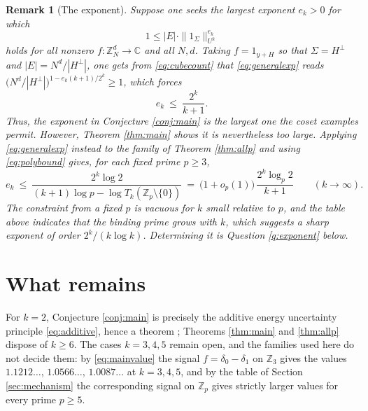 \documentclass[12pt]{amsart}
\newcommand{\Z}{\mathbb{Z}}
\newcommand{\C}{\mathbb{C}}
\newtheorem{remark}[theorem]{Remark}
\begin{document}
\begin{remark}[The exponent]\label{rem:exponent}
Suppose one seeks the largest exponent $e_k>0$ for which
\begin{equation}\label{eq:generalexp}
1\le |E|\cdot\|1_\Sigma\|_{U^k}^{e_k}
\end{equation}
holds for all nonzero $f:\Z_N^d\to\C$ and all $N,d$. Taking $f=1_{y+H}$ so that $\Sigma=H^\perp$ and $|E|=N^d/|H^\perp|$, one gets from \eqref{eq:cubecount} that \eqref{eq:generalexp} reads
$\bigl(N^d/|H^\perp|\bigr)^{1-e_k(k+1)/2^k}\ge1$, which forces
\[
e_k\ \le\ \frac{2^k}{k+1}.
\]
Thus, the exponent in Conjecture \ref{conj:main} is the largest one the coset examples permit. However, Theorem \ref{thm:main} shows it is nevertheless too large. Applying \eqref{eq:generalexp} instead to the family of Theorem \ref{thm:allp} and using \eqref{eq:polybound} gives, for each fixed prime $p\ge3$,
\[
e_k\ \le\ \frac{2^k\log 2}{(k+1)\log p-\log T_k(\Z_p\setminus\{0\})}\ =\ \bigl(1+o_p(1)\bigr)\,\frac{2^k\log_p 2}{k+1}
\qquad (k\to\infty).
\]
The constraint from a fixed $p$ is vacuous for $k$ small relative to $p$, and the table above indicates that the binding prime grows with $k$, which suggests a sharp exponent of order $2^k/(k\log k)$. Determining it is Question \ref{q:exponent} below.
\end{remark}

\section{What remains}\label{sec:survives}

For $k=2$, Conjecture \ref{conj:main} is precisely the additive energy uncertainty principle \eqref{eq:additive}, hence a theorem \cite{2025additiveenergyuncertaintyprinciple}; Theorems \ref{thm:main} and \ref{thm:allp} dispose of $k\ge6$. The cases $k=3,4,5$ remain open, and the families used here do not decide them: by \eqref{eq:mainvalue} the signal $f=\delta_0-\delta_1$ on $\Z_3$ gives the values $1.1212\ldots$, $1.0566\ldots$, $1.0087\ldots$ at $k=3,4,5$, and by the table of Section \ref{sec:mechanism} the corresponding signal on $\Z_p$ gives strictly larger values for every prime $p\ge5$.
\end{document}
